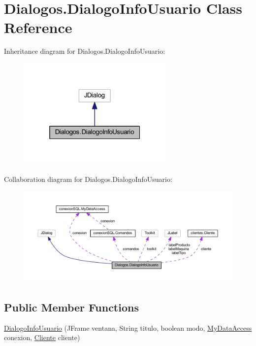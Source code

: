 \hypertarget{class_dialogos_1_1_dialogo_info_usuario}{}\section{Dialogos.\+Dialogo\+Info\+Usuario Class Reference}
\label{class_dialogos_1_1_dialogo_info_usuario}


Inheritance diagram for Dialogos.\+Dialogo\+Info\+Usuario\+:
\nopagebreak
\begin{figure}[H]
\begin{center}
\leavevmode
\includegraphics[width=217pt]{class_dialogos_1_1_dialogo_info_usuario__inherit__graph}
\end{center}
\end{figure}


Collaboration diagram for Dialogos.\+Dialogo\+Info\+Usuario\+:
\nopagebreak
\begin{figure}[H]
\begin{center}
\leavevmode
\includegraphics[width=350pt]{class_dialogos_1_1_dialogo_info_usuario__coll__graph}
\end{center}
\end{figure}
\subsection*{Public Member Functions}
\begin{DoxyCompactItemize}
\item 
\mbox{\hyperlink{class_dialogos_1_1_dialogo_info_usuario_a982fb6f8438bc01fe5496a16b890ab29}{Dialogo\+Info\+Usuario}} (J\+Frame ventana, String titulo, boolean modo, \mbox{\hyperlink{classconexion_s_q_l_1_1_my_data_access}{My\+Data\+Access}} conexion, \mbox{\hyperlink{classclientes_1_1_cliente}{Cliente}} cliente)
\end{DoxyCompactItemize}



